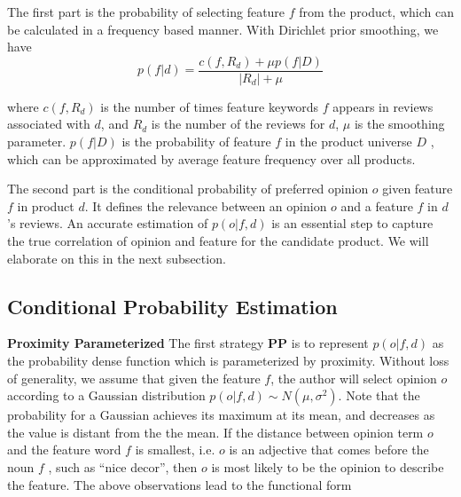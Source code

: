 \documentclass[preprint]{elsarticle}
\begin{document}
The first part is the probability of selecting feature $f$ from the product, which can be calculated in a frequency based manner. With Dirichlet prior smoothing, we have
\begin{equation}
p(f|d)=\frac{c(f,R_d)+\mu p(f|D)}{|R_d|+\mu}
\label{equ:feature}
\end{equation}

where  $c(f,R_d)$ is the number of times feature keywords $f$ appears in reviews associated with $d$, and $R_d$ is the number of the reviews for $d$, $\mu$ is the smoothing parameter. $p(f|D)$ is the probability of feature $f$ in the product universe $D$ , which can be approximated by average feature frequency over all products.

The second part is the conditional probability of preferred opinion $o$ given feature $f$ in product $d$. It defines the relevance between an opinion $o$ and a feature $f$ in $d$'s reviews. An accurate estimation of $p(o|f,d)$ is an essential step to capture the true correlation of opinion and feature for the candidate product. We will elaborate on this in the next subsection.

\subsection{Conditional Probability Estimation}

\textbf{Proximity Parameterized} The first strategy \textbf{PP} is to represent $p(o|f,d)$ as the probability dense function which is parameterized by proximity. Without loss of generality, we assume that given the feature $f$, the author will select opinion $o$ according to a Gaussian distribution $p(o|f,d)\sim N(\mu,\sigma^2)$. Note that the probability for a Gaussian achieves its maximum at its mean, and decreases as the value is distant from the the mean. If the distance between opinion term $o$ and the feature word $f$ is smallest, i.e. $o$ is an adjective that comes before the noun $f$ ,  such as ``nice decor'', then $o$ is most likely to be the opinion to describe the feature. The above observations lead to the functional form
\end{document}
